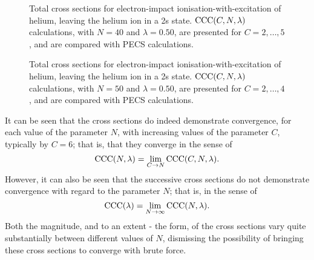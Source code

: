 \documentclass[]{article}
\begin{document}
\begin{figure}[h]
  \begin{center}
    
  \end{center}
  \caption[TICS-with-excitation: $\mathrm{CCC}\lr{C, 40, 0.50}$]{
    Total cross sections for electron-impact ionisation-with-excitation of
    helium, leaving the helium ion in a 2s state.
    $\mathrm{CCC}(C, N, \lambda)$ calculations, with $N = 40$ and
    $\lambda = 0.50$, are presented for $C = 2, \dotsc, 5$, and are compared
    with PECS \cite{PhysRevA.81.022716} calculations.
  }
  \label{fig:cs_tics_ie_n_40}
\end{figure}

\begin{figure}[h]
  \begin{center}
    
  \end{center}
  \caption[TICS-with-excitation: $\mathrm{CCC}\lr{C, 50, 0.50}$]{
    Total cross sections for electron-impact ionisation-with-excitation of
    helium, leaving the helium ion in a 2s state.
    $\mathrm{CCC}(C, N, \lambda)$ calculations, with $N = 50$ and
    $\lambda = 0.50$, are presented for $C = 2, \dotsc, 4$, and are compared
    with PECS \cite{PhysRevA.81.022716} calculations.
  }
  \label{fig:cs_tics_ie_n_50}
\end{figure}

\clearpage


It can be seen that the cross sections do indeed demonstrate convergence, for
each value of the parameter $N$, with increasing values of the parameter $C$,
typically by $C = 6$; that is, that they converge in the sense of
\begin{equation*}
  \mathrm{CCC}(N, \lambda)
  =
  \lim_{C \to N}
  \mathrm{CCC}(C, N, \lambda)
  .
\end{equation*}
However, it can also be seen that the successive cross sections do not
demonstrate convergence with regard to the parameter $N$; that is, in the sense
of
\begin{equation*}
  \mathrm{CCC}(\lambda)
  =
  \lim_{N \to \infty}
  \mathrm{CCC}(N, \lambda)
  .
\end{equation*}
Both the magnitude, and to an extent - the form, of the cross sections vary
quite substantially between different values of $N$, dismissing the possibility
of bringing these cross sections to converge with brute force.
\end{document}
